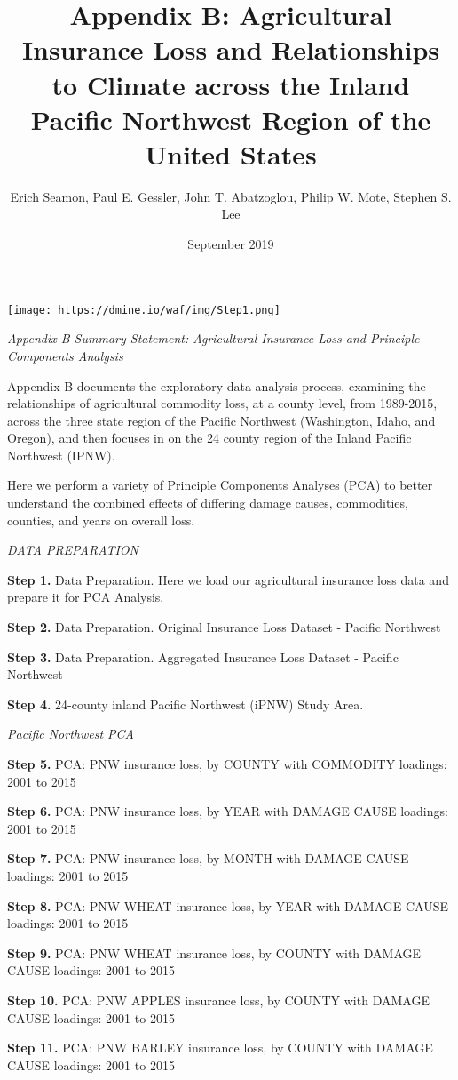\documentclass[]{article}
\title{Appendix B: Agricultural Insurance Loss and Relationships to Climate
across the Inland Pacific Northwest Region of the United States}
\author{Erich Seamon, Paul E. Gessler, John T. Abatzoglou, Philip W. Mote,
Stephen S. Lee}
\date{September 2019}
\begin{document}
\maketitle

\texttt{[image: https://dmine.io/waf/img/Step1.png]}

\emph{Appendix B Summary Statement: Agricultural Insurance Loss and
Principle Components Analysis}

Appendix B documents the exploratory data analysis process, examining
the relationships of agricultural commodity loss, at a county level,
from 1989-2015, across the three state region of the Pacific Northwest
(Washington, Idaho, and Oregon), and then focuses in on the 24 county
region of the Inland Pacific Northwest (IPNW).

Here we perform a variety of Principle Components Analyses (PCA) to
better understand the combined effects of differing damage causes,
commodities, counties, and years on overall loss.

\emph{DATA PREPARATION}

\textbf{Step 1.} Data Preparation. Here we load our agricultural
insurance loss data and prepare it for PCA Analysis.

\textbf{Step 2.} Data Preparation. Original Insurance Loss Dataset -
Pacific Northwest

\textbf{Step 3.} Data Preparation. Aggregated Insurance Loss Dataset -
Pacific Northwest

\textbf{Step 4.} 24-county inland Pacific Northwest (iPNW) Study Area.

\emph{Pacific Northwest PCA}

\textbf{Step 5.} PCA: PNW insurance loss, by COUNTY with COMMODITY
loadings: 2001 to 2015

\textbf{Step 6.} PCA: PNW insurance loss, by YEAR with DAMAGE CAUSE
loadings: 2001 to 2015

\textbf{Step 7.} PCA: PNW insurance loss, by MONTH with DAMAGE CAUSE
loadings: 2001 to 2015

\textbf{Step 8.} PCA: PNW WHEAT insurance loss, by YEAR with DAMAGE
CAUSE loadings: 2001 to 2015

\textbf{Step 9.} PCA: PNW WHEAT insurance loss, by COUNTY with DAMAGE
CAUSE loadings: 2001 to 2015

\textbf{Step 10.} PCA: PNW APPLES insurance loss, by COUNTY with DAMAGE
CAUSE loadings: 2001 to 2015

\textbf{Step 11.} PCA: PNW BARLEY insurance loss, by COUNTY with DAMAGE
CAUSE loadings: 2001 to 2015
\end{document}

